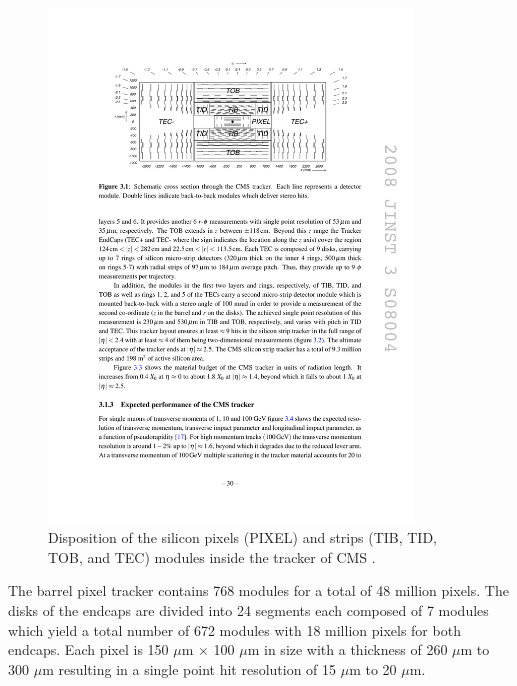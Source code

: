     \begin{figure}[b!]
      \centering
      \includegraphics[width=0.86\textwidth]{img/I-3-cms/tracker.pdf}
      \caption{Disposition of the silicon pixels (PIXEL) and strips (TIB, TID, TOB, and TEC) modules inside the tracker of CMS \cite{1748-0221-3-08-S08004}.}
      \label{fig:I-3-tracker}
    \end{figure}

    The barrel pixel tracker contains 768 modules for a total of 48 million pixels. The disks of the endcaps are divided into 24 segments each composed of 7 modules which yield a total number of 672 modules with 18 million pixels for both endcaps. Each pixel is 150 $\mu$m $\times$ 100 $\mu$m in size with a thickness of 260 $\mu$m to 300 $\mu$m resulting in a single point hit resolution of 15 $\mu$m to 20 $\mu$m. \\

